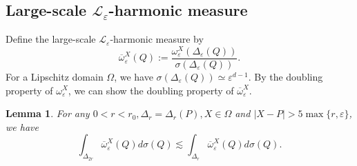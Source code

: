\documentclass[reqno,12pt]{amsart} %
\newtheorem{lemma}[theorem]{Lemma}
\theoremstyle{definition}
\theoremstyle{remark}
\numberwithin{equation}{section}
\newcommand{\cL}{\mathcal{L}}
\newcommand{\e}{\varepsilon}
\begin{document}
\subsection{Large-scale $\cL_\e$-harmonic measure}
Define the large-scale $\cL_\e$-harmonic measure by
\begin{equation}\label{def.LSomega}
    \overline{\omega}^X_\e(Q) := \frac{\omega_\e^X(\Delta_\e(Q))}{\sigma(\Delta_\e(Q))}.
\end{equation}
For a Lipschitz domain $\Omega$, we have $\sigma(\Delta_\e(Q)) \simeq \e^{d-1}$.
By the doubling property of $\omega^X_\e$, we can show the doubling property of $\overline{\omega}^X_\e$.
\begin{lemma}\label{lem.doubling}
For any $0<r<r_0, \Delta_r = \Delta_r(P), X \in \Omega $ and $|X - P| > 5\max\{ r,\e \}$, we have
\begin{equation}\label{est.doubling}
    \int_{\Delta_{2r}} \overline{\omega}^X_\e(Q) d\sigma(Q) \lesssim \int_{\Delta_{r}} \overline{\omega}^X_\e(Q) d\sigma(Q).
\end{equation}
\end{lemma}
\end{document}
